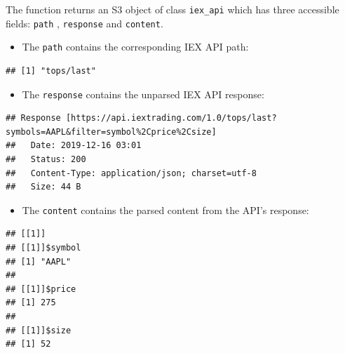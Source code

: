 \documentclass[]{book}
\newenvironment{Shaded}{\begin{snugshade}}{\end{snugshade}}
\newcommand{\OperatorTok}[1]{\textcolor[rgb]{0.81,0.36,0.00}{\textbf{#1}}}
\newcommand{\NormalTok}[1]{#1}
\providecommand{\tightlist}{%
  \setlength{\itemsep}{0pt}\setlength{\parskip}{0pt}}
\theoremstyle{definition}
\theoremstyle{definition}
\theoremstyle{definition}
\theoremstyle{remark}
\begin{document}
The function returns an S3 object of class \texttt{iex\_api} which has
three accessible fields: \texttt{path} , \texttt{response} and
\texttt{content}.

\begin{itemize}
\tightlist
\item
  The \texttt{path} contains the corresponding IEX API path:
\end{itemize}

\begin{Shaded}
\end{Shaded}

\begin{verbatim}
## [1] "tops/last"
\end{verbatim}

\begin{itemize}
\tightlist
\item
  The \texttt{response} contains the unparsed IEX API response:
\end{itemize}

\begin{Shaded}
\end{Shaded}

\begin{verbatim}
## Response [https://api.iextrading.com/1.0/tops/last?symbols=AAPL&filter=symbol%2Cprice%2Csize]
##   Date: 2019-12-16 03:01
##   Status: 200
##   Content-Type: application/json; charset=utf-8
##   Size: 44 B
\end{verbatim}

\begin{itemize}
\tightlist
\item
  The \texttt{content} contains the parsed content from the API's
  response:
\end{itemize}

\begin{Shaded}
\end{Shaded}

\begin{verbatim}
## [[1]]
## [[1]]$symbol
## [1] "AAPL"
## 
## [[1]]$price
## [1] 275
## 
## [[1]]$size
## [1] 52
\end{verbatim}
\end{document}
